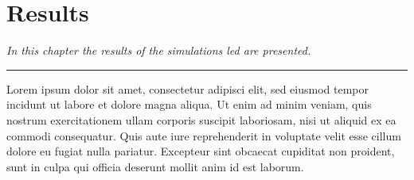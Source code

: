 \chapter{Results}\label{ch:results}
\textit{In this chapter the results of the simulations led are presented.}
\vspace{0.25cm}
\par\fancybreak{$***$}\par
\vspace{0.35cm}

Lorem ipsum dolor sit amet, consectetur adipisci elit, sed eiusmod tempor incidunt ut labore et dolore magna aliqua. Ut enim ad minim veniam, quis nostrum exercitationem ullam corporis suscipit laboriosam, nisi ut aliquid ex ea commodi consequatur. Quis aute iure reprehenderit in voluptate velit esse cillum dolore eu fugiat nulla pariatur. Excepteur sint obcaecat cupiditat non proident, sunt in culpa qui officia deserunt mollit anim id est laborum.

